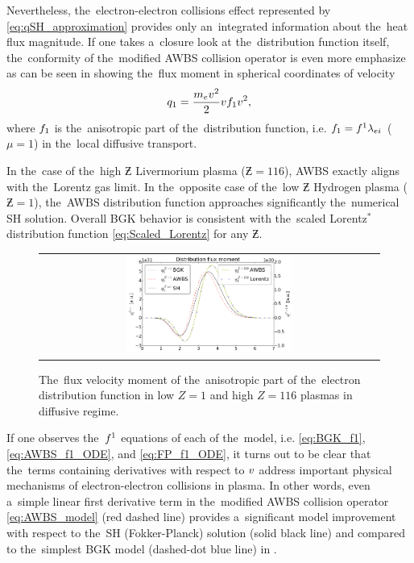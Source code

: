 Nevertheless, the~electron-electron collisions effect represented by 
\eqref{eq:qSH_approximation} provides only an~integrated information about
the~heat flux magnitude. If one takes a~closure look at the~distribution
function itself, the~conformity of the~modified AWBS collision operator
is even more emphasize as can be seen in  showing
the~flux moment in spherical coordinates of velocity
\begin{equation}
  q_1 = \frac{m_ev^2}{2}v f_1 v^2 ,
  \nonumber
\end{equation}
where $f_1$ is the~anisotropic part of the~distribution function, i.e.
$f_1 = f^1\lambda_{ei}$ ($\mu=1$) in the~local diffusive transport.

In the~case of the~high $\Zbar$ Livermorium plasma ($\Zbar = 116$), 
AWBS exactly aligns with the~Lorentz gas limit. In the~opposite case of the~low
$\Zbar$ Hydrogen plasma ($\Zbar = 1$), the~AWBS distribution function 
approaches significantly the~numerical SH solution. Overall BGK behavior is 
consistent with the~scaled Lorentz$^*$ distribution function 
\eqref{eq:Scaled_Lorentz} for any $\Zbar$.  

\begin{figure}[tbh]
  \begin{center}
    \begin{tabular}{c}
      \includegraphics[width=0.5\textwidth]{q1s.png}
    \end{tabular}
  \caption{  
  The~flux velocity moment of the~anisotropic part of the~electron distribution 
  function in low $Z=1$ and high $Z=116$ plasmas in diffusive regime.}
  \label{app_fig:q1s_summary}
  \end{center} 
\end{figure}

If one observes the~$f^1$ equations of each of the~model, i.e.
\eqref{eq:BGK_f1}, \eqref{eq:AWBS_f1_ODE}, and \eqref{eq:FP_f1_ODE}, it turns
out to be clear that the~terms containing derivatives with respect to $v$ 
address important physical mechanisms of electron-electron collisions in plasma.
In other words, even a~simple linear first derivative term in the~modified
AWBS collision operator \eqref{eq:AWBS_model} (red dashed line) provides 
a~significant model improvement with respect to the~SH (Fokker-Planck) solution
(solid black line) and compared to the~simplest BGK model
(dashed-dot blue line) in .

